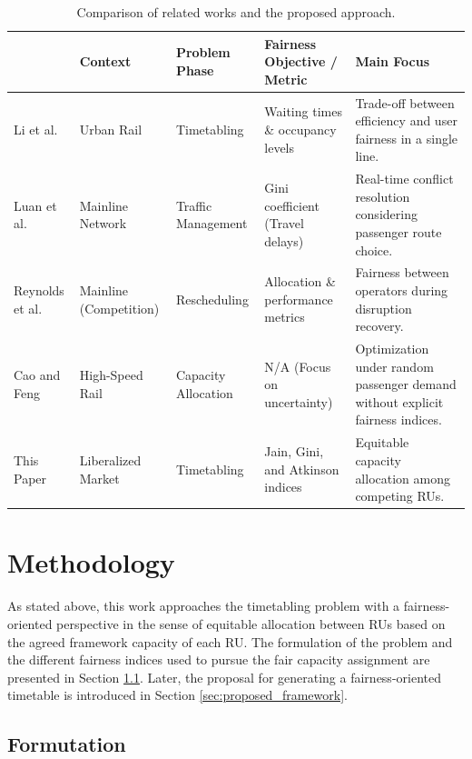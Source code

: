 \documentclass[preprint,12pt]{elsarticle}
\begin{document}
\begin{table}[htbp]
\centering
\begin{adjustbox}{max width=\textwidth}
\begin{tabular}{|l|C{60pt}|C{70pt}|C{100pt}|C{140pt}|}
\hline
{} & \textbf{Context} & \textbf{Problem Phase} & \textbf{Fairness Objective / Metric} & \textbf{Main Focus} \\
\hline \hline
Li et al. \cite{Zhang2019} & Urban Rail & Timetabling & Waiting times \& occupancy levels & Trade-off between efficiency and user fairness in a single line. \\ \hline
Luan et al. \cite{Luan2023} & Mainline Network & Traffic Management & Gini coefficient (Travel delays) & Real-time conflict resolution considering passenger route choice. \\ \hline
Reynolds et al. \cite{Reynolds2023} & Mainline (Competition) & Rescheduling & Allocation \& performance metrics & Fairness between operators during disruption recovery. \\ \hline
Cao and Feng \cite{Cao2020} & High-Speed Rail & Capacity Allocation & N/A (Focus on uncertainty) & Optimization under random passenger demand without explicit fairness indices. \\ \hline
This Paper & Liberalized Market & Timetabling & Jain, Gini, and Atkinson indices & Equitable capacity allocation among competing RUs. \\ \hline
\end{tabular}
\end{adjustbox}
\caption{Comparison of related works and the proposed approach.}
\label{tab:contrib_comparison}
\end{table}

\section{Methodology}\label{sec:Methodology}

As stated above, this work approaches the timetabling problem with a fairness-oriented perspective in the sense of equitable allocation between \glspl{RU} based on the agreed framework capacity of each RU. The formulation of the problem  and the different fairness indices used to pursue the fair capacity assignment are presented in Section \ref{sec:formulation}. Later, the proposal for generating a fairness-oriented timetable is introduced in Section \ref{sec:proposed_framework}.

\subsection{Formutation}\label{sec:formulation}
\end{document}
